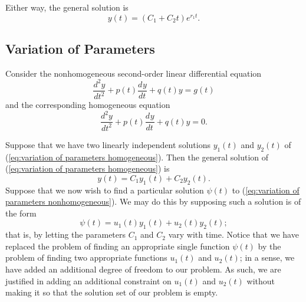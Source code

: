 \documentclass{myart}
\newcommand{\eq}[1]{(\ref{eq:#1})}
\newcommand{\deriv}[3][]{\frac{d^{#1}#2}{d#3^{#1}}}
\begin{document}
Either way, the general solution is
\begin{equation*}
y(t) = (C_1 + C_2t)e^{r_1t}.
\end{equation*}

\subsection{Variation of Parameters} \label{subsec:variation of parameters}

Consider the nonhomogeneous second-order linear differential equation
\begin{equation} \label{eq:variation of parameters nonhomogeneous}
\deriv[2]{y}{t} + p(t) \deriv{y}{t} + q(t)y = g(t)
\end{equation}
and the corresponding homogeneous equation
\begin{equation} \label{eq:variation of parameters homogeneous}
\deriv[2]{y}{t} + p(t) \deriv{y}{t} + q(t)y = 0.
\end{equation}

Suppose that we have two linearly independent solutions $y_1(t)$ and $y_2(t)$ of \eq{variation of parameters homogeneous}. Then the general solution of \eq{variation of parameters homogeneous} is
\begin{equation*}
y(t) = C_1y_1(t) + C_2y_2(t).
\end{equation*}
Suppose that we now wish to find a particular solution $\psi(t)$ to \eq{variation of parameters nonhomogeneous}. We may do this by supposing such a solution is of the form
\begin{equation}
\psi(t) = u_1(t)y_1(t) + u_2(t)y_2(t);
\end{equation}
that is, by letting the parameters $C_1$ and $C_2$ vary with time. Notice that we have replaced the problem of finding an appropriate single function $\psi(t)$ by the problem of finding two appropriate functions $u_1(t)$ and $u_2(t)$; in a sense, we have added an additional degree of freedom to our problem. As such, we are justified in adding an additional constraint on $u_1(t)$ and $u_2(t)$ without making it so that the solution set of our problem is empty.
\end{document}
